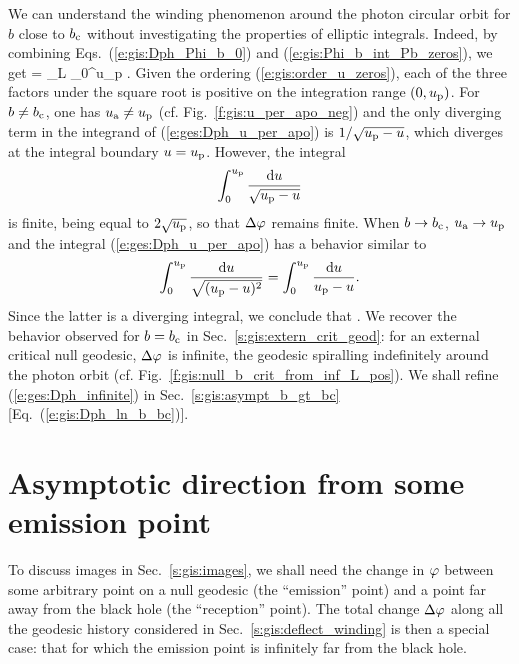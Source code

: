 We can understand the winding phenomenon
around the photon circular orbit for $b$ close to $b_{\rm c}$
without investigating the properties of elliptic integrals.
Indeed, by combining Eqs.~(\ref{e:gis:Dph_Phi_b_0}) and (\ref{e:gis:Phi_b_int_Pb_zeros}),
we get
\be \label{e:ges:Dph_u_per_apo}
    \Delta\ph = \eps_L  \int_0^{u_{\rm p}}
     .
\ee
Given the ordering (\ref{e:gis:order_u_zeros}), each of the
three factors under the square root is positive on the integration range
$(0,u_{\rm p})$. For $b\not=b_{\rm c}$, one has $u_{\rm a}\not=u_{\rm p}$
(cf. Fig.~\ref{f:gis:u_per_apo_neg})
and
the only diverging term in the integrand of (\ref{e:ges:Dph_u_per_apo})
is $1/\sqrt{u_{\rm p} - u}$, which
diverges at the integral boundary $u=u_{\rm p}$. However, the integral
\[
    \int_0^{u_{\rm p}}
    \frac{\mathrm{d} u}{\sqrt{u_{\rm p} - u}}
\]
is finite, being equal to $2\sqrt{u_{\rm p}}$, so that $\Delta\varphi$ remains
finite. When $b\to b_{\rm c}$,
$u_{\rm a} \to u_{\rm p}$ and the integral (\ref{e:ges:Dph_u_per_apo})
has a behavior similar to
\[
     \int_0^{u_{\rm p}}
    \frac{\mathrm{d} u}{\sqrt{(u_{\rm p} - u)^2}} = \int_0^{u_{\rm p}}
    \frac{\mathrm{d} u}{u_{\rm p} - u} .
\]
Since the latter is a diverging integral, we conclude that
\be \label{e:ges:Dph_infinite}
    .
\ee
We recover the behavior observed for $b=b_{\rm c}$ in
Sec.~\ref{s:gis:extern_crit_geod}: for
an external critical null geodesic,
$\Delta\varphi$ is infinite, the geodesic spiralling indefinitely around the
photon orbit (cf. Fig.~\ref{f:gis:null_b_crit_from_inf_L_pos}).
We shall refine (\ref{e:ges:Dph_infinite}) in Sec.~\ref{s:gis:asympt_b_gt_bc}
[Eq.~(\ref{e:gis:Dph_ln_b_bc})].


\section{Asymptotic direction from some emission point} \label{s:gis:asymp}

To discuss images in Sec.~\ref{s:gis:images},
we shall need the change in $\varphi$ between some
arbitrary point on a null geodesic (the ``emission'' point)
and a point far away from the black hole (the ``reception'' point).
The total change $\Delta\varphi$ along all the geodesic history
considered in Sec.~\ref{s:gis:deflect_winding} is then a special case: that for which the emission point is
infinitely far from the black hole.


